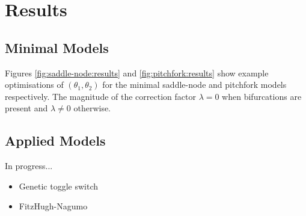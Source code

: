 \section{Results}

\subsection{Minimal Models}
Figures \ref{fig:saddle-node:results} and \ref{fig:pitchfork:results} show example optimisations of $(\theta_1,\theta_2)$ for the minimal saddle-node and pitchfork models respectively. The magnitude of the correction factor $\lambda=0$ when bifurcations are present and $\lambda\neq0$ otherwise.

\subsection{Applied Models}
In progress...
\begin{itemize}
    \item Genetic toggle switch
    \item FitzHugh-Nagumo
\end{itemize}



